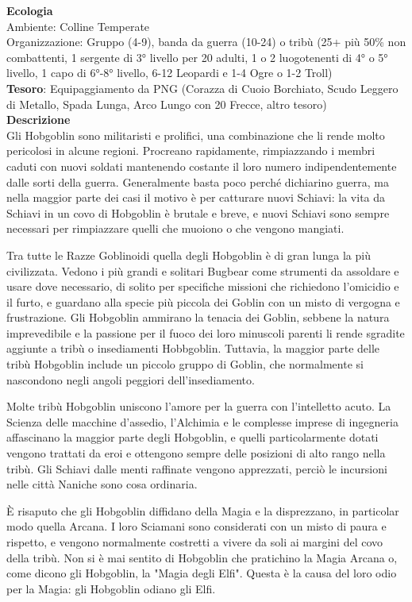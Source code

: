 \begin{multicols}{2}
\textbf{Ecologia}\\
Ambiente: Colline Temperate\\
Organizzazione: Gruppo (4-9), banda da guerra (10-24) o tribù (25+ più 50\% non combattenti, 1 sergente di 3° livello per 20 adulti, 1 o 2 luogotenenti di 4° o 5° livello, 1 capo di 6°-8° livello, 6-12 Leopardi e 1-4 Ogre o 1-2 Troll)\\
\textbf{Tesoro}: Equipaggiamento da PNG (Corazza di Cuoio Borchiato, Scudo Leggero di Metallo, Spada Lunga, Arco Lungo con 20 Frecce, altro tesoro)\\
\textbf{Descrizione}\\
Gli Hobgoblin sono militaristi e prolifici, una combinazione che li rende molto pericolosi in alcune regioni. Procreano rapidamente, rimpiazzando i membri caduti con nuovi soldati mantenendo costante il loro numero indipendentemente dalle sorti della guerra. Generalmente basta poco perché dichiarino guerra, ma nella maggior parte dei casi il motivo è per catturare nuovi Schiavi: la vita da Schiavi in un covo di Hobgoblin è brutale e breve, e nuovi Schiavi sono sempre necessari per rimpiazzare quelli che muoiono o che vengono mangiati.

Tra tutte le Razze Goblinoidi quella degli Hobgoblin è di gran lunga la più civilizzata.
Vedono i più grandi e solitari Bugbear come strumenti da assoldare e usare dove necessario, di solito per specifiche missioni che richiedono l'omicidio e il furto, e guardano alla specie più piccola dei Goblin con un misto di vergogna e frustrazione. Gli Hobgoblin ammirano la tenacia dei Goblin, sebbene la natura imprevedibile e la passione per il fuoco dei loro minuscoli parenti li rende sgradite aggiunte a tribù o insediamenti Hobbgoblin. Tuttavia, la maggior parte delle tribù Hobgoblin include un piccolo gruppo di Goblin, che normalmente si nascondono negli angoli peggiori dell'insediamento.

Molte tribù Hobgoblin uniscono l'amore per la guerra con l'intelletto acuto. La Scienza delle macchine d'assedio, l'Alchimia e le complesse imprese di ingegneria affascinano la maggior parte degli Hobgoblin, e quelli particolarmente dotati vengono trattati da eroi e ottengono sempre delle posizioni di alto rango nella tribù. Gli Schiavi dalle menti raffinate vengono apprezzati, perciò le incursioni nelle città Naniche sono cosa ordinaria.

È risaputo che gli Hobgoblin diffidano della Magia e la disprezzano, in particolar modo quella Arcana. I loro Sciamani sono considerati con un misto di paura e rispetto, e vengono normalmente costretti a vivere da soli ai margini del covo della tribù. Non si è mai sentito di Hobgoblin che pratichino la Magia Arcana o, come dicono gli Hobgoblin, la "Magia degli Elfi". Questa è la causa del loro odio per la Magia: gli Hobgoblin odiano gli Elfi.


\end{multicols}
